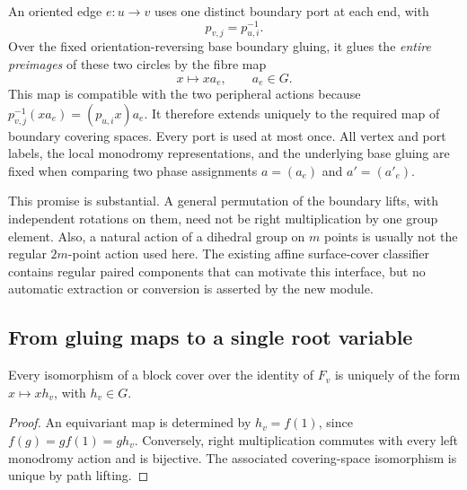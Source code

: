 An oriented edge $e:u\to v$ uses one distinct boundary port at each end,
with
\[
 p_{v,j}=p_{u,i}^{-1}.
\]
Over the fixed orientation-reversing base boundary gluing, it glues the
\emph{entire preimages} of these two circles by the fibre map
\[
 x\longmapsto x a_e,\qquad a_e\in G.
\]
This map is compatible with the two peripheral actions because
$p_{v,j}^{-1}(xa_e)=(p_{u,i}x)a_e$.
It therefore extends uniquely to the required map of boundary covering
spaces.  Every port is used at most once.  All vertex and port labels,
the local monodromy representations, and the underlying base gluing are
fixed when comparing two phase assignments $a=(a_e)$ and $a'=(a'_e)$.

This promise is substantial.  A general permutation of the boundary
lifts, with independent rotations on them, need not be right
multiplication by one group element.  Also, a natural action of a
dihedral group on $m$ points is usually not the regular $2m$-point action
used here.  The existing affine surface-cover classifier contains regular
paired components that can motivate this interface, but no automatic
extraction or conversion is asserted by the new module.

\subsection{From gluing maps to a single root variable}

\begin{lemma}
Every isomorphism of a block cover over the identity of $F_v$ is uniquely
of the form $x\mapsto xh_v$, with $h_v\in G$.
\end{lemma}
\begin{proof}
An equivariant map is determined by $h_v=f(1)$, since
$f(g)=gf(1)=gh_v$.  Conversely, right multiplication commutes with every
left monodromy action and is bijective.  The associated covering-space
isomorphism is unique by path lifting.
\end{proof}

